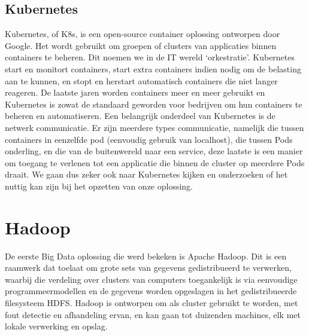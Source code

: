 \subsection{Kubernetes}
Kubernetes, of K8s, is een open-source container oplossing ontworpen door Google. Het wordt gebruikt om groepen of clusters van applicaties binnen containers te beheren. Dit noemen we in de IT wereld ‘orkestratie’. \autocite{Wikipedia2023a}
\newline
Kubernetes start en monitort containers, start extra containers indien nodig om de belasting aan te kunnen, en stopt en herstart automatisch containers die niet langer reageren.\autocite{Guthrie2022}
\newline
\newline
De laatste jaren worden containers meer en meer gebruikt en Kubernetes is zowat de standaard geworden voor bedrijven om hun containers te beheren en automatiseren.
\autocite{Razorops2022}
\newline
\newline
Een belangrijk onderdeel van Kubernetes is de netwerk communicatie. Er zijn meerdere types communicatie, namelijk die tussen containers in eenzelfde pod (eenvoudig gebruik van localhost), die tussen Pods onderling, en die van de buitenwereld naar een service, deze laatste is een manier om toegang te verlenen tot een applicatie die binnen de cluster op meerdere Pods draait.
\autocite{Kubernetes2023a}
\autocite{Kubernetes2023b}
\newline
\newline
We gaan dus zeker ook naar Kubernetes kijken en onderzoeken of het nuttig kan zijn bij het opzetten van onze oplossing.

\section{Hadoop}
De eerste Big Data oplossing die werd bekeken is Apache Hadoop. Dit is een raamwerk dat toelaat om grote sets van gegevens gedistribueerd te verwerken, waarbij die verdeling over clusters van computers toegankelijk is via eenvoudige programmeermodellen en de gegevens worden opgeslagen in het gedistribueerde filesysteem HDFS.
\newline
Hadoop is ontworpen om als cluster gebruikt te worden, met fout detectie en afhandeling ervan, en kan gaan tot duizenden machines, elk met lokale verwerking en opslag. \autocite{ASF2022}

